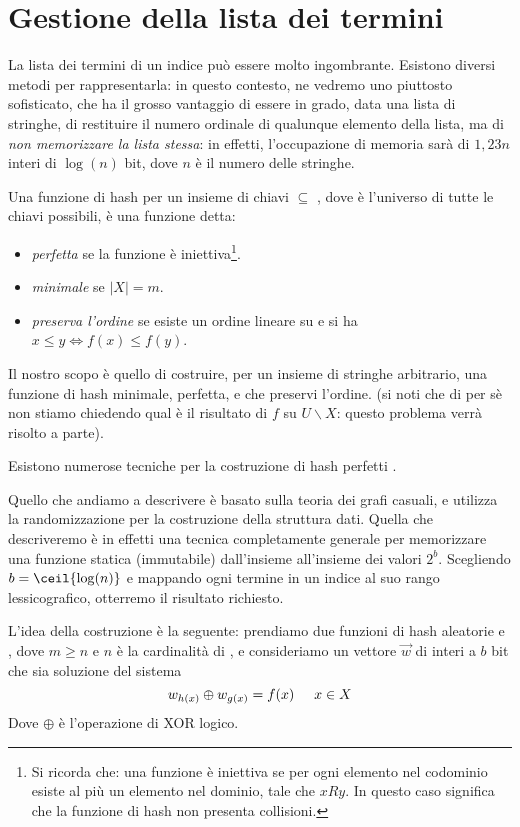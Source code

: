 \chapter{Gestione della lista dei termini}
La lista dei termini di un indice può essere molto ingombrante. Esistono diversi metodi per rappresentarla: in questo contesto, ne vedremo uno piuttosto sofisticato, che ha il grosso vantaggio di essere in grado, data una lista di stringhe, di restituire il numero ordinale di qualunque elemento della lista, ma di \textit{non memorizzare la lista stessa}: in effetti, l'occupazione di memoria sarà di $1,23n$ interi di $\log(n)$ bit, dove $n$ è il numero delle stringhe.

Una funzione di hash per un insieme di chiavi  $\subseteq$ , dove  è l'universo di tutte le chiavi possibili, è una funzione  detta:
\begin{itemize}
	\item \textit{perfetta} se la funzione è iniettiva\footnote{Si ricorda che: una funzione è iniettiva se per ogni elemento nel codominio esiste al più un elemento nel dominio, tale che $x R y$. In questo caso significa che la funzione di hash non presenta collisioni.}.
	\item \textit{minimale} se $|X| = m$.
	\item \textit{preserva l'ordine} se esiste un ordine lineare su  e si ha $x \leq y \iff f(x) \leq f(y)$.
\end{itemize}
Il nostro scopo è quello di costruire, per un insieme di stringhe arbitrario, una funzione di hash minimale, perfetta, e che preservi l'ordine. (si noti che di per sè non stiamo chiedendo qual è il risultato di $f$ su $U \smallsetminus X$: questo problema verrà risolto a parte).

Esistono numerose tecniche per la costruzione di hash perfetti \cite{mwhc}.

Quello che andiamo a descrivere è basato sulla teoria dei grafi casuali, e utilizza la randomizzazione per la costruzione della struttura dati. Quella che descriveremo è in effetti una tecnica completamente generale per memorizzare una funzione statica (immutabile)  dall'insieme  all'insieme dei valori $2^b$. Scegliendo $b = \ceil{\log(n)}$ e mappando ogni termine in un indice al suo rango lessicografico, otterremo il risultato richiesto.

L'idea della costruzione è la seguente: prendiamo due funzioni di hash aleatorie  e , dove $m \geq n$ e $n$ è la cardinalità di , e consideriamo un vettore $\vec{w}$ di interi a $b$ bit che sia soluzione del sistema
\begin{equation}
	w_{h(x)} \oplus w_{g(x)} = f(x) \hspace{5mm} x \in X
\end{equation}
Dove $\oplus$ è l'operazione di XOR logico.

